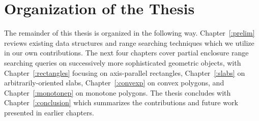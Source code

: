 \section{Organization of the Thesis}
\label{:intro:organization}

The remainder of this thesis is organized in the following way. 
Chapter~\ref{:prelim} reviews existing data structures and range searching techniques which we utilize in our own contributions.
The next four chapters cover partial enclosure range searching queries on successively more sophisticated geometric objects, with Chapter~\ref{:rectangles} focusing on axis-parallel rectangles, Chapter~\ref{:slabs} on arbitrarily-oriented slabs, Chapter~\ref{:convexp} on convex polygons, and Chapter~\ref{:monotonep} on monotone polygons.
The thesis concludes with Chapter~\ref{:conclusion} which summarizes the contributions and future work presented in earlier chapters.
